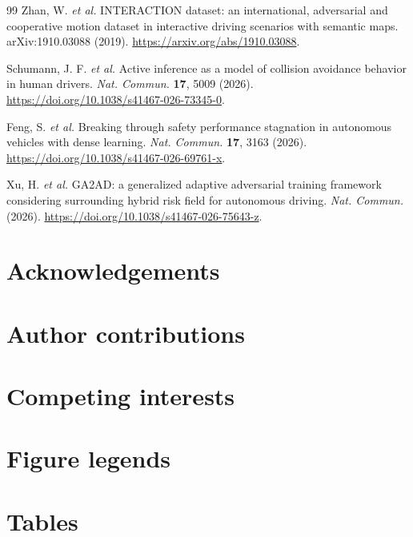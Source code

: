 \documentclass[10pt,a4paper,twocolumn]{article}
\begin{document}
\begin{thebibliography}{99}
Zhan, W. \textit{et al.} INTERACTION dataset: an international, adversarial and cooperative motion dataset in interactive driving scenarios with semantic maps. arXiv:1910.03088 (2019). \url{https://arxiv.org/abs/1910.03088}.

Schumann, J. F. \textit{et al.} Active inference as a model of collision avoidance behavior in human drivers. \textit{Nat. Commun.} \textbf{17}, 5009 (2026). \url{https://doi.org/10.1038/s41467-026-73345-0}.

Feng, S. \textit{et al.} Breaking through safety performance stagnation in autonomous vehicles with dense learning. \textit{Nat. Commun.} \textbf{17}, 3163 (2026). \url{https://doi.org/10.1038/s41467-026-69761-x}.

Xu, H. \textit{et al.} GA2AD: a generalized adaptive adversarial training framework considering surrounding hybrid risk field for autonomous driving. \textit{Nat. Commun.} (2026). \url{https://doi.org/10.1038/s41467-026-75643-z}.

\end{thebibliography}
\endgroup

\section*{Acknowledgements}

\section*{Author contributions}

\section*{Competing interests}

\section*{Figure legends}

\section*{Tables}
\end{document}
